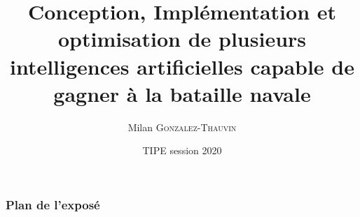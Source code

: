 \documentclass{beamer}
\title[Bataille Navale]{Conception, Implémentation et optimisation de plusieurs
intelligences artificielles capable de gagner à la bataille navale}
\author{Milan \textsc{Gonzalez-Thauvin}}
\institute[ ]{Thème : Océan}
\date{TIPE session 2020}
\begin{document}
	\begin{frame}
	\titlepage 
	\end{frame}
	
	\begin{frame}
	\frametitle{Plan de l'exposé} 
	\tableofcontents 
	\end{frame}
	
	
	
	
	
	
	
\end{document}
